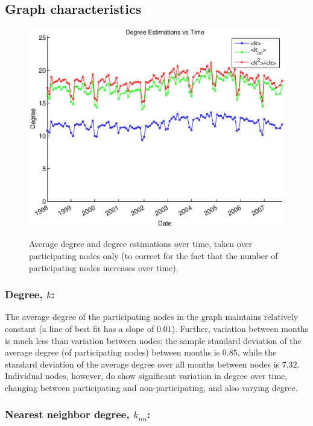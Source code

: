 \documentclass[12pt]{article}
\begin{document}
\subsection{Graph characteristics}

\begin{figure}[H]
\includegraphics[trim = 0cm 0cm 0cm 0cm, width = .9\textwidth]{Graficos/NearestNeighbors.eps}
\label{fig:k}
\caption{Average degree and degree estimations over time, taken over participating nodes only (to correct for the fact that the number of participating nodes increases over time). }
\label{fig:nn}
\end{figure}

\subsubsection*{Degree, \(k\):}

The average degree of the participating nodes in the graph maintains relatively constant (a line of best fit has a slope of \(0.01\)). Further, variation between months is much less than variation between nodes: the sample standard deviation of the average degree (of participating nodes) between months is \(0.85\), while the standard deviation of the average degree over all months between nodes is \(7.32\). Individual nodes, however, do show significant variation in degree over time, changing between participating and non-participating, and also varying degree.

\subsubsection*{Nearest neighbor degree, \(k_{nn}\):}
\end{document}
